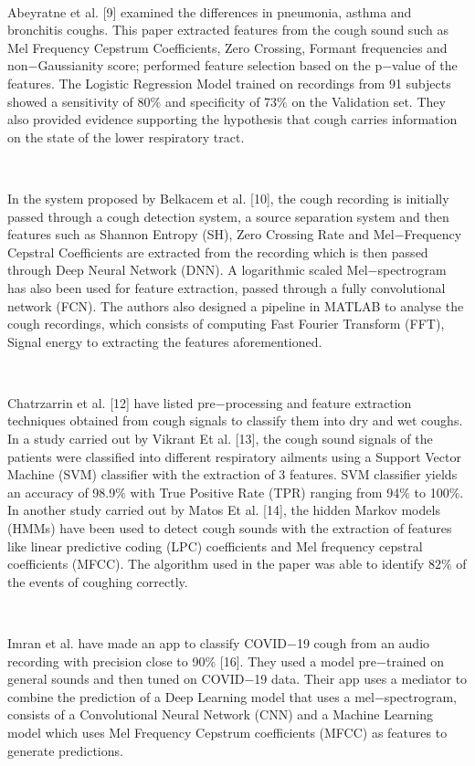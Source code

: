 \documentclass[11pt]{article}
\begin{document}
\textcolor[HTML]{0E101A}{ }

\textcolor[HTML]{0E101A}{Abeyratne et al. [9] examined the differences in pneumonia, asthma and bronchitis coughs. This paper extracted features from the cough sound such as Mel Frequency Cepstrum Coefficients, Zero Crossing, Formant frequencies and non$-$Gaussianity score; performed feature selection based on the p$-$value of the features. The Logistic Regression Model trained on recordings from 91 subjects showed a sensitivity of 80$\%$ and specificity of 73$\%$ on the Validation set. They also provided evidence supporting the hypothesis that cough carries information on the state of the lower respiratory tract.  }

\textcolor[HTML]{0E101A}{ }

\textcolor[HTML]{0E101A}{In the system proposed by Belkacem et al. [10], the cough recording is initially passed through a cough detection system, a source separation system and then features such as Shannon Entropy (SH), Zero Crossing Rate and Mel$-$Frequency Cepstral Coefficients are extracted from the recording which is then passed through Deep Neural Network (DNN). A logarithmic scaled Mel$-$spectrogram has also been used for feature extraction, passed through a fully convolutional network (FCN). The authors also designed a pipeline in MATLAB to analyse the cough recordings, which consists of computing Fast Fourier Transform (FFT), Signal energy to extracting the features aforementioned.}

\textcolor[HTML]{0E101A}{ }

\textcolor[HTML]{0E101A}{Chatrzarrin et al. [12] have listed pre$-$processing and feature extraction techniques obtained from cough signals to classify them into dry and wet coughs. In a study carried out by Vikrant Et al. [13], the cough sound signals of the patients were classified into different respiratory ailments using a Support Vector Machine (SVM) classifier with the extraction of 3 features. SVM classifier yields an accuracy of 98.9$\%$ with True Positive Rate (TPR) ranging from 94$\%$ to 100$\%$. In another study carried out by Matos Et al. [14], the hidden Markov models (HMMs) have been used to detect cough sounds with the extraction of features like linear predictive coding (LPC) coefficients and Mel frequency cepstral coefficients (MFCC). The algorithm used in the paper was able to identify 82$\%$ of the events of coughing correctly. }

\textcolor[HTML]{0E101A}{ }

\textcolor[HTML]{0E101A}{Imran et al. have made an app to classify COVID$-$19 cough from an audio recording with precision close to 90$\%$ [16]. They used a model pre$-$trained on general sounds and then tuned on COVID$-$19 data. Their app uses a mediator to combine the prediction of a Deep Learning model that uses a mel$-$spectrogram, consists of a Convolutional Neural Network (CNN) and a Machine Learning model which uses Mel Frequency Cepstrum coefficients (MFCC) as features to generate predictions.}
\end{document}
